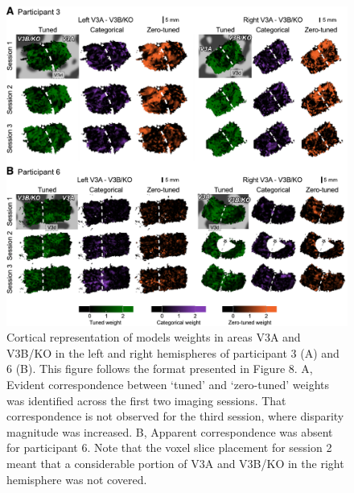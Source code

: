 \begin{figure}
  \centering
  \includegraphics[width=14cm, keepaspectratio]{fig9}
  \caption[Cortical representation of models weights for participants 3 and 6]{Cortical representation of models weights in areas V3A and V3B/KO in the left and right hemispheres of participant 3 (A) and 6 (B). This figure follows the format presented in Figure 8. A, Evident correspondence between `tuned' and `zero-tuned' weights was identified across the first two imaging sessions. That correspondence is not observed for the third session, where disparity magnitude was increased. B, Apparent correspondence was absent for participant 6. Note that the voxel slice placement for session 2 meant that a considerable portion of V3A and V3B/KO in the right hemisphere was not covered.}
  \label{fig:ch4fig9}
\end{figure}

